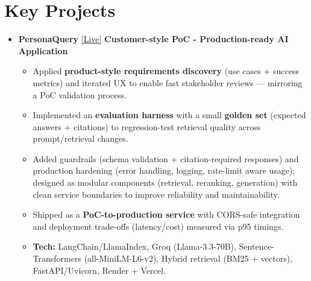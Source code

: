 \documentclass[letterpaper,11pt]{article}
\begin{document}
\section{Key Projects}
\vspace{-1pt}
\begin{itemize}[leftmargin=0.0in, label={}]

\item \small \textbf{PersonaQuery} \href{https://personaquery.vercel.app/}{\small [Live]} \hfill \small \textbf{Customer-style PoC - Production-ready AI Application}
\vspace{-9pt}
\begin{itemize}[leftmargin=0.4cm]
\vspace{-3.5pt}
\item \small Applied \textbf{product-style requirements discovery} (use cases + success metrics) and iterated UX to enable fast stakeholder reviews --- mirroring a PoC validation process.
\item \small Implemented an \textbf{evaluation harness} with a small \textbf{golden set} (expected answers + citations) to regression-test retrieval quality across prompt/retrieval changes.
\vspace{-3.5pt}
\item \small Added {guardrails} (schema validation + citation-required responses) and production hardening ({error handling, logging,} rate-limit aware usage); designed as {modular components} (retrieval, reranking, generation) with clean service boundaries to improve reliability and maintainability.
\vspace{-3.5pt}
\item \small Shipped as a \textbf{PoC-to-production service} with CORS-safe integration and deployment trade-offs (latency/cost) measured via p95 timings.
\vspace{-3.5pt}
\item \small \textbf{Tech:} LangChain/LlamaIndex, Groq (Llama-3.3-70B), Sentence-Transformers (all-MiniLM-L6-v2), Hybrid retrieval (BM25 + vectors), FastAPI/Uvicorn, Render + Vercel.
\vspace{-3.5pt}
\end{itemize}
\vspace{-10pt}


\end{itemize}
\end{document}
